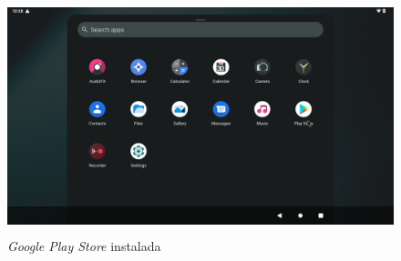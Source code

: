 \documentclass[letterpaper,10.5pt]{article}
\begin{document}
\begin{figure}[H]
	\centering%
	\includegraphics[width=0.9\linewidth,height=68mm,keepaspectratio]{img/p02-06-playstore.png} %
	\caption{\emph{Google Play Store} instalada}
	\label{fig:playstore} %
\end{figure}
\end{document}
